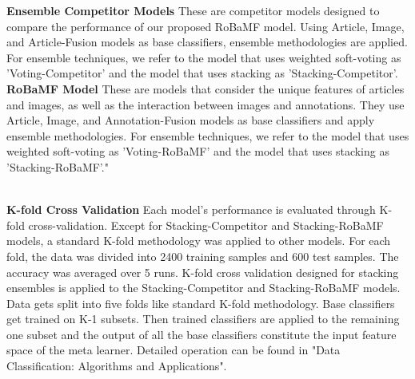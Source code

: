 \documentclass{article}
\begin{document}
\textbf{Ensemble Competitor Models}\quad
These are competitor models designed to compare the performance of our proposed RoBaMF model. Using Article, Image, and Article-Fusion models as base classifiers, ensemble methodologies are applied. For ensemble techniques, we refer to the model that uses weighted soft-voting as 'Voting-Competitor' and the model that uses stacking as 'Stacking-Competitor'.\\


\textbf{RoBaMF Model}\quad
These are models that consider the unique features of articles and images, as well as the interaction between images and annotations. They use Article, Image, and Annotation-Fusion models as base classifiers and apply ensemble methodologies.
For ensemble techniques, we refer to the model that uses weighted soft-voting as 'Voting-RoBaMF' and the model that uses stacking as 'Stacking-RoBaMF'."

\\

\textbf{K-fold Cross Validation}\quad
Each model's performance is evaluated through K-fold cross-validation. Except for Stacking-Competitor and Stacking-RoBaMF models, a standard K-fold methodology was applied to other models. For each fold, the data was divided into 2400 training samples and 600 test samples. The accuracy was averaged over 5 runs.
K-fold cross validation designed for stacking ensembles is applied to the Stacking-Competitor and Stacking-RoBaMF models.
Data gets split into five folds like standard K-fold methodology.
Base classifiers get trained on K-1 subsets. Then trained classifiers are applied to the remaining one subset and the output of all the base classifiers constitute the input feature space of the meta learner.
Detailed operation can be found in "Data Classification: Algorithms and Applications".



\end{document}
